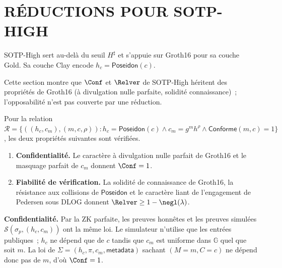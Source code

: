 \section{R\'EDUCTIONS POUR SOTP-HIGH}
\label{sec:gamebased_SOTP-High}
\begin{sloppypar}
SOTP-High sert au-del\`a du seuil $H^\sharp$ et s'appuie sur Groth16
pour sa couche Gold. Sa couche Clay encode $h_c = \mathsf{Poseidon}(c)$.

Cette section montre que $\Conf$ et $\Relver$ de SOTP-High h\'eritent des propri\'et\'es de
Groth16 (\`a divulgation nulle parfaite, solidit\'e connaissance)~; l'opposabilit\'e
n'est pas couverte par une r\'eduction.

\begin{theorem}\label{thm:ann_sotp_high}
Pour la relation $\mathcal{R} = \{((h_c, c_m), (m, c, \rho)) : h_c = \mathsf{Poseidon}(c)
\wedge c_m = g^m h^\rho \wedge \mathsf{Conforme}(m,c) = 1\}$, les deux propri\'et\'es suivantes sont v\'erifi\'ees.
\begin{enumerate}
\item \textbf{Confidentialité.} Le caract\`ere \`a divulgation nulle parfait
      de Groth16 et le masquage parfait de $c_m$ donnent $\Conf = 1$.
\item \textbf{Fiabilité de v\'erification.} La solidité de connaissance de
      Groth16, la r\'esistance aux collisions de $\mathsf{Poseidon}$ et le caract\`ere liant de
      l'engagement de Pedersen sous DLOG donnent
      $\Relver \geq 1 - \negl(\lambda)$.
\end{enumerate}
\end{theorem}

\begin{Preuve}

\textbf{Confidentialit\'e.} Par la ZK parfaite, les preuves honn\^etes et les
preuves simul\'ees $\mathcal{S}(\sigma_p, (h_c, c_m))$ ont la m\^eme loi. Le
simulateur n'utilise que les entr\'ees publiques~; $h_c$ ne d\'epend que de $c$ tandis que
$c_m$ est uniforme dans $\mathbb{G}$ quel que soit $m$. La loi de
$\Sigma = (h_c, \pi, c_m, \mathsf{metadata})$ sachant $(M = m, C = c)$ ne d\'epend donc
pas de $m$, d'o\`u $\Conf = 1$.


\end{Preuve}
\end{sloppypar}
